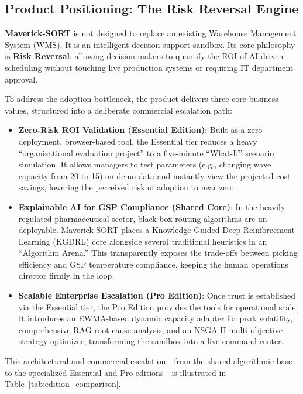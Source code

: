 \subsection{Product Positioning: The Risk Reversal Engine}

\textbf{Maverick-SORT} is not designed to replace an existing Warehouse Management System (WMS). It is an intelligent decision-support sandbox. Its core philosophy is \textbf{Risk Reversal}: allowing decision-makers to quantify the ROI of AI-driven scheduling without touching live production systems or requiring IT department approval.

To address the adoption bottleneck, the product delivers three core business values, structured into a deliberate commercial escalation path:

\begin{itemize}
    \item \textbf{Zero-Risk ROI Validation (Essential Edition)}: Built as a zero-deployment, browser-based tool, the Essential tier reduces a heavy ``organizational evaluation project'' to a five-minute ``What-If'' scenario simulation. It allows managers to test parameters (e.g., changing wave capacity from 20 to 15) on demo data and instantly view the projected cost savings, lowering the perceived risk of adoption to near zero.
    
    \item \textbf{Explainable AI for GSP Compliance (Shared Core)}: In the heavily regulated pharmaceutical sector, black-box routing algorithms are un-deployable. Maverick-SORT places a Knowledge-Guided Deep Reinforcement Learning (KGDRL) core alongside several traditional heuristics in an ``Algorithm Arena.'' This transparently exposes the trade-offs between picking efficiency and GSP temperature compliance, keeping the human operations director firmly in the loop.
    
    \item \textbf{Scalable Enterprise Escalation (Pro Edition)}: Once trust is established via the Essential tier, the Pro Edition provides the tools for operational scale. It introduces an EWMA-based dynamic capacity adapter for peak volatility, comprehensive RAG root-cause analysis, and an NSGA-II multi-objective strategy optimizer, transforming the sandbox into a live command center.
\end{itemize}

This architectural and commercial escalation---from the shared algorithmic base to the specialized Essential and Pro editions---is illustrated in Table~\ref{tab:edition_comparison}.

